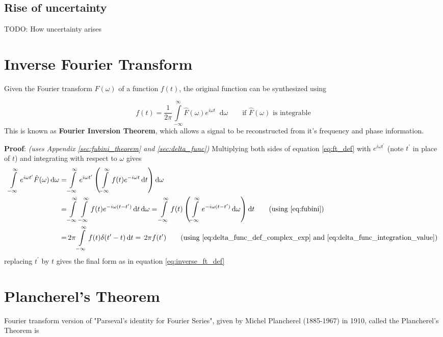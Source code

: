 \documentclass[11pt, a4paper]{article}
\let\oldsection\section
\renewcommand{\section}{%
	\setcounter{equation}{0}%
	\oldsection%
}
\newcommand{\eqrefnp}[1]{\textup{\ref{#1}}}
\newcommand{\primed}[1]{#1^{\prime}}
\newcommand{\tp}{\primed{t}}	%
\newcommand{\diff}{\mathop{}\!\mathrm{d}}
\newcommand{\dt}{\diff t}
\newcommand{\domega}{\diff \omega}
\newcommand{\dint}[2]{\int \limits_{#1}^{#2}}  %
\newcommand{\intinfty}{\dint{-\infty}{\infty}}	%
\newcommand{\iintinfty}{\intinfty \intinfty}	%
\begin{document}
\subsection{Rise of uncertainty}\label{sec:fourier_transform_intuitive_uncertainty}
TODO: How uncertainty arises

\section{Inverse Fourier Transform}\label{sec:inverse_fourier_transform}
Given the Fourier transform $\hat{F}(\omega)$ of a function $f(t)$, the original function can be synthesized using

\begin{equation}\label{eq:inverse_ft_def}
	\boxed{
		f(t) = \frac{1}{2\pi} \intinfty \hat{F}(\omega)e^{i\omega t} \domega
	} \qquad \text{if $\hat{F}(\omega)$ is integrable}
\end{equation}
This is known as \textbf{Fourier Inversion Theorem}, which allows a signal to be reconstructed from it's frequency and phase information. \cite{herman2016fourieranalysis}

\vspace{4pt}
\textbf{Proof}: \textit{(uses Appendix \ref{sec:fubini_theorem} and \ref{sec:delta_func})} Multiplying both sides of equation \eqref{eq:ft_def} with $e^{i\omega \tp}$ (note $\tp$ in place of $t$) and integrating with respect to $\omega$ gives
\begin{align*}
	\intinfty e^{i\omega \tp} \hat{F}(\omega) \domega 
	= & \intinfty e^{i\omega \tp} \left(\intinfty f(t) e^{-i\omega t} \dt \right) \domega \\
	= & \iintinfty f(t) e^{-i\omega (t - \tp)} \dt \domega
	= \intinfty f(t) \left(\intinfty  e^{-i\omega (t - \tp)} \domega \right) \dt \tag{using \eqrefnp{eq:fubini}} \\
	= & \, 2 \pi \intinfty f(t) \delta (\tp - t) \dt = \, 2 \pi f(\tp) \tag{using \eqrefnp{eq:delta_func_def_complex_exp} and \eqrefnp{eq:delta_func_integration_value}}
\end{align*} 
replacing $\tp$ by $t$ gives the final form as in equation \eqref{eq:inverse_ft_def}

\section{Plancherel's Theorem}\label{sec:plancherel_theorem}
Fourier transform version of "Parseval's identity for Fourier Series", given by Michel Plancherel (1885-1967) in 1910, called the Plancherel's Theorem is \cite{herman2016fourieranalysis}
\end{document}
